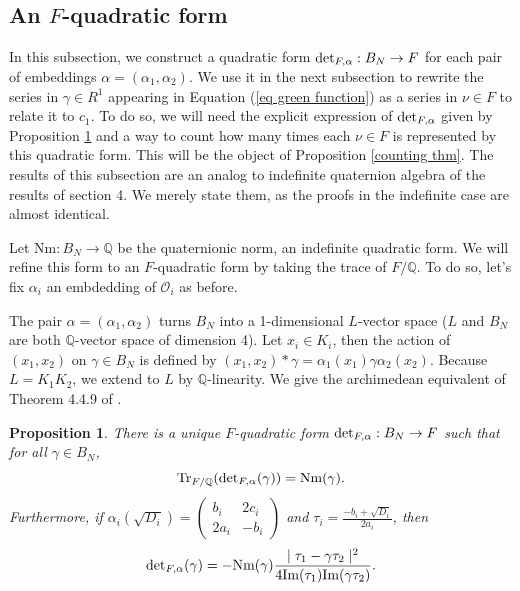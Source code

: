 \documentclass[a4paper,12pt]{article}
\newtheorem{proposition}[theorem]{Proposition}
\begin{document}
\subsection{\texorpdfstring{An $F$-quadratic form}{An F-quadratic form}}\label{F quad form}
In this subsection, we construct a quadratic form $\textup{det}_{F,\alpha}:B_{N}\rightarrow F$ for each pair of embeddings $\alpha=(\alpha_1,\alpha_2)$. We use it in the next subsection to rewrite the series in $\gamma\in R^1$ appearing in Equation (\ref{eq green function}) as a series in $\nu\in F$ to relate it to $c_1$. To do so, we will need the explicit expression of $\textup{det}_{F,\alpha}$ given by Proposition \ref{quadform} and a way to count how many times each $\nu\in F$ is represented by this quadratic form. This will be the object of Proposition \ref{counting thm}. The results of this subsection are an analog to indefinite quaternion algebra of the results of \cite{Daas} section 4. We merely state them, as the proofs in the indefinite case are almost identical.
\par
Let $\text{Nm}:B_{N}\rightarrow \mathbb{Q}$ be the quaternionic norm, an indefinite quadratic form. We will refine this form to an $F$-quadratic form by taking the trace of $F/\mathbb{Q}$. To do so, let's fix $\alpha_i$ an embdedding of $\mathcal{O}_i$ as before.
\par
The pair $\alpha=(\alpha_1,\alpha_2)$ turns $B_{N}$ into a 1-dimensional $L$-vector space  ($L$ and $B_N$ are both $\mathbb{Q}$-vector space of dimension 4). Let $x_i\in K_i$, then the action of $(x_1,x_2)$ on $\gamma\in B_{N}$ is defined by $(x_1,x_2)\ast \gamma=\alpha_1(x_1)\gamma\alpha_2(x_2)$. Because $L=K_1K_2$, we extend to $L$ by $\mathbb{Q}$-linearity. We give the archimedean equivalent of Theorem 4.4.9 of \cite{Daas}.
\begin{proposition}\label{quadform}
    There is a unique $F$-quadratic form $\textup{det}_{F,\alpha}:B_{N}\rightarrow F$ such that for all $\gamma\in B_{N}$, 
    \[\textup{Tr}_{F/\mathbb{Q}}(\textup{det}_{F,\alpha}(\gamma))=\textup{Nm}(\gamma).\]
Furthermore, if $\alpha_i(\sqrt{D_i})=\begin{pmatrix} b_i & 2c_i \\ 2a_i & -b_i
\end{pmatrix}$ and $\tau_i=\frac{-b_i+\sqrt{D_i}}{2a_i}$, then
\begin{equation}
    \textup{det}_{F,\alpha}(\gamma)=-\textup{Nm}(\gamma)\frac{\mid \tau_1-\gamma\tau_2\mid^2}{4\text{\normalfont{Im}}(\tau_1)\text{\normalfont{Im}}(\gamma\tau_2) }.
\end{equation}
\end{proposition}
\end{document}

